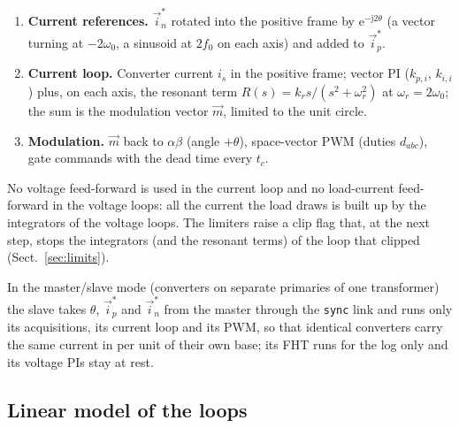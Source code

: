 \documentclass[10pt,a4paper]{scrartcl}
\newcommand{\wo}{\omega_0}
\newcommand{\wres}{\omega_r}
\newcommand{\kpi}{k_{p,i}}
\newcommand{\kii}{k_{i,i}}
\newcommand{\jj}{\mathrm{j}}
\newcommand{\ee}{\mathrm{e}}
\newcommand{\code}[1]{\texttt{#1}}
\begin{document}
\begin{onehalfspace}
\begin{enumerate}
\item \textbf{Current references.} $\vec i^*_n$ rotated into the positive frame by $\ee^{-\jj 2\theta}$ (a vector turning at $-2\wo$, a sinusoid at $2f_0$ on each axis) and added to $\vec i^*_p$.
\item \textbf{Current loop.} Converter current $i_s$ in the positive frame; vector PI ($\kpi$, $\kii$) plus, on each axis, the resonant term $R(s) = k_r s/(s^2 + \wres^2)$ at $\wres = 2\wo$; the sum is the modulation vector $\vec m$, limited to the unit circle.
\item \textbf{Modulation.} $\vec m$ back to $\alpha\beta$ (angle $+\theta$), space-vector PWM (duties $d_{abc}$), gate commands with the dead time every $t_c$.
\end{enumerate}
No voltage feed-forward is used in the current loop and no load-current feed-forward in the voltage loops: all the current the load draws is built up by the integrators of the voltage loops. The limiters raise a clip flag that, at the next step, stops the integrators (and the resonant terms) of the loop that clipped (Sect.~\ref{sec:limits}).

In the master/slave mode (converters on separate primaries of one transformer) the slave takes $\theta$, $\vec i^*_p$ and $\vec i^*_n$ from the master through the \code{sync} link and runs only its acquisitions, its current loop and its PWM, so that identical converters carry the same current in per unit of their own base; its FHT runs for the log only and its voltage PIs stay at rest.


\subsection{Linear model of the loops}


\end{onehalfspace}
\end{document}
